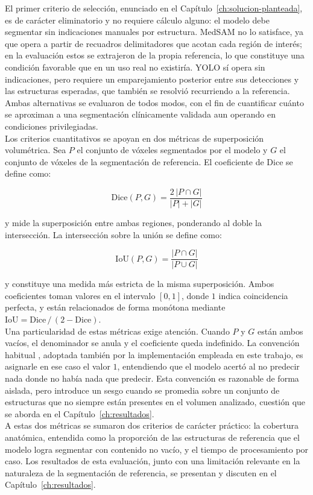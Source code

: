 El primer criterio de selección, enunciado en el Capítulo~\ref{ch:solucion-planteada}, es de carácter eliminatorio y no requiere cálculo alguno: el modelo debe segmentar sin indicaciones manuales por estructura. MedSAM no lo satisface, ya que opera a partir de recuadros delimitadores que acotan cada región de interés; en la evaluación estos se extrajeron de la propia referencia, lo que constituye una condición favorable que en un uso real no existiría. YOLO sí opera sin indicaciones, pero requiere un emparejamiento posterior entre sus detecciones y las estructuras esperadas, que también se resolvió recurriendo a la referencia. Ambas alternativas se evaluaron de todos modos, con el fin de cuantificar cuánto se aproximan a una segmentación clínicamente validada aun operando en condiciones privilegiadas.\\

Los criterios cuantitativos se apoyan en dos métricas de superposición volumétrica. Sea $P$ el conjunto de vóxeles segmentados por el modelo y $G$ el conjunto de vóxeles de la segmentación de referencia. El coeficiente de Dice se define como:

\begin{equation}
\mathrm{Dice}(P,G) = \frac{2\,|P \cap G|}{|P| + |G|}
\end{equation}

y mide la superposición entre ambas regiones, ponderando al doble la intersección. La intersección sobre la unión se define como:

\begin{equation}
\mathrm{IoU}(P,G) = \frac{|P \cap G|}{|P \cup G|}
\end{equation}

y constituye una medida más estricta de la misma superposición. Ambos coeficientes toman valores en el intervalo $[0,1]$, donde $1$ indica coincidencia perfecta, y están relacionados de forma monótona mediante $\mathrm{IoU} = \mathrm{Dice}\,/\,(2 - \mathrm{Dice})$.\\

Una particularidad de estas métricas exige atención. Cuando $P$ y $G$ están ambos vacíos, el denominador se anula y el coeficiente queda indefinido. La convención habitual \citep{taha2015metrics}, adoptada también por la implementación empleada en este trabajo, es asignarle en ese caso el valor $1$, entendiendo que el modelo acertó al no predecir nada donde no había nada que predecir. Esta convención es razonable de forma aislada, pero introduce un sesgo cuando se promedia sobre un conjunto de estructuras que no siempre están presentes en el volumen analizado, cuestión que se aborda en el Capítulo~\ref{ch:resultados}.\\

A estas dos métricas se sumaron dos criterios de carácter práctico: la cobertura anatómica, entendida como la proporción de las estructuras de referencia que el modelo logra segmentar con contenido no vacío, y el tiempo de procesamiento por caso. Los resultados de esta evaluación, junto con una limitación relevante en la naturaleza de la segmentación de referencia, se presentan y discuten en el Capítulo~\ref{ch:resultados}.\\
